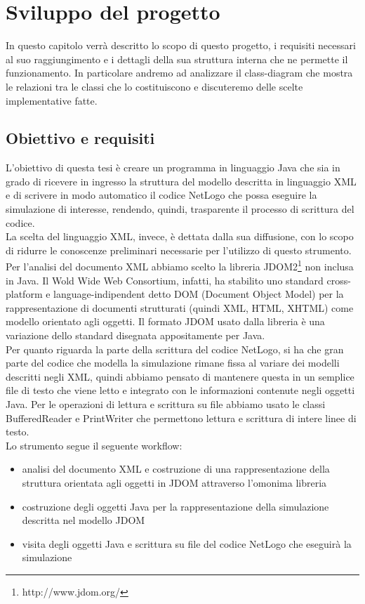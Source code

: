 \chapter{Sviluppo del progetto}
In questo capitolo verrà descritto lo scopo di questo progetto, i requisiti necessari al suo raggiungimento e i dettagli della sua struttura interna che ne permette il funzionamento. In particolare andremo ad analizzare il class-diagram che mostra le relazioni tra le classi che lo costituiscono e discuteremo delle scelte implementative fatte.

\section{Obiettivo e requisiti}
L'obiettivo di questa tesi è creare un programma in linguaggio Java che sia in grado di ricevere in ingresso la struttura del modello descritta in linguaggio XML e di scrivere in modo automatico il codice NetLogo che possa eseguire la simulazione di interesse, rendendo, quindi, trasparente il processo di scrittura del codice.\\
La scelta del linguaggio XML, invece, è dettata dalla sua diffusione, con lo scopo di ridurre le conoscenze preliminari necessarie per l'utilizzo di questo strumento.\\
Per l'analisi del documento XML abbiamo scelto la libreria JDOM2\footnote{http://www.jdom.org/} non inclusa in Java. Il Wold Wide Web Consortium, infatti, ha stabilito uno standard cross-platform e language-indipendent detto DOM (Document Object Model) per la rappresentazione di documenti strutturati (quindi XML, HTML, XHTML) come modello orientato agli oggetti. Il formato JDOM usato dalla libreria è una variazione dello standard disegnata appositamente per Java.\\
Per quanto riguarda la parte della scrittura del codice NetLogo, si ha che gran parte del codice che modella la simulazione rimane fissa al variare dei modelli descritti negli XML, quindi abbiamo pensato di mantenere questa in un semplice file di testo che viene letto e integrato con le informazioni contenute negli oggetti Java. Per le operazioni di lettura e scrittura su file abbiamo usato le classi BufferedReader e PrintWriter che permettono lettura e scrittura di intere linee di testo.\\
Lo strumento segue il seguente workflow:
\begin{itemize}
\item analisi del documento XML e costruzione di una rappresentazione della struttura orientata agli oggetti in JDOM attraverso l'omonima libreria
\item costruzione degli oggetti Java per la rappresentazione della simulazione descritta nel modello JDOM 
\item visita degli oggetti Java e scrittura su file del codice NetLogo che eseguirà la simulazione
\end{itemize}

